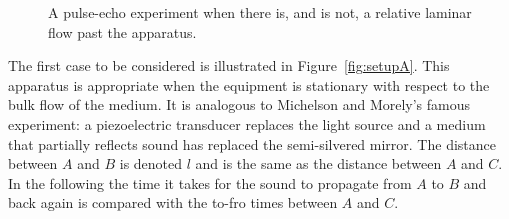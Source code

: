 \documentclass[10pt, fleqn,final,showtrims,oldfontcommands, article,a4paper,oneside]{memoir} %
\newcommand{\secref}[1]{section~\ref{sec:#1}}
\newcommand{\figref}[1]{Figure~\ref{fig:#1}}
\newcommand{\tm}{\tau^-}
\newcommand{\tp}{\tau^+}
\begin{document}









 \begin{figure}[t]
      \centering
\hspace{2cm}
\label{fig:setups}
      \caption{A pulse-echo experiment when there is, and is not, a relative laminar flow past the apparatus.}
 \end{figure}
The first case to be considered is illustrated in \figref{setupA}.
This apparatus is appropriate when the equipment is stationary with respect to the bulk flow of the medium.
It is  analogous to  Michelson and Morely's famous experiment:
a piezoelectric transducer  replaces the light source and a medium that partially reflects sound has replaced the semi-silvered mirror.
The distance between $A$ and $B$ is denoted $l$ and is the same  as the distance between $A$ and $C$.
In the following the time it takes for the sound to propagate from $A$ to $B$ and back again is compared with the to-fro times between $A$ and $C$.
\end{document}
